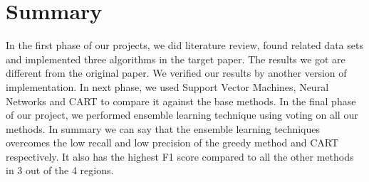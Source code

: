 \documentclass[conference]{IEEEtran}
\begin{document}
\section{Summary}
In the first phase of our projects, we  did literature review, found related data sets and implemented three algorithms in the target paper. The results we got are different from the original paper. We verified our results by another version of implementation.  In next phase, we used Support Vector Machines, Neural Networks and CART to compare it against the base methods. In the final phase of our project, we performed ensemble learning technique using voting on all our methods. In summary we can say that the ensemble learning techniques overcomes the low recall and low precision of the greedy method and CART respectively. It also has the highest F1 score compared to all the other methods in 3 out of the 4 regions.
 



\end{document}
